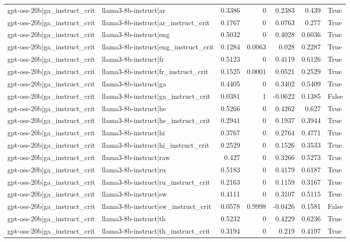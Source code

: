 \begin{table}
\begin{tabular}{l l r r r r l}
gpt-oss-20b|ga_instruct_crit & llama3-8b-instruct|ar & 0.3386 & 0 & 0.2383 & 0.439 & True \\
gpt-oss-20b|ga_instruct_crit & llama3-8b-instruct|ar_instruct_crit & 0.1767 & 0 & 0.0763 & 0.277 & True \\
gpt-oss-20b|ga_instruct_crit & llama3-8b-instruct|eng & 0.5032 & 0 & 0.4028 & 0.6036 & True \\
gpt-oss-20b|ga_instruct_crit & llama3-8b-instruct|eng_instruct_crit & 0.1284 & 0.0063 & 0.028 & 0.2287 & True \\
gpt-oss-20b|ga_instruct_crit & llama3-8b-instruct|fr & 0.5123 & 0 & 0.4119 & 0.6126 & True \\
gpt-oss-20b|ga_instruct_crit & llama3-8b-instruct|fr_instruct_crit & 0.1525 & 0.0001 & 0.0521 & 0.2529 & True \\
gpt-oss-20b|ga_instruct_crit & llama3-8b-instruct|ga & 0.4405 & 0 & 0.3402 & 0.5409 & True \\
gpt-oss-20b|ga_instruct_crit & llama3-8b-instruct|ga_instruct_crit & 0.0381 & 1 & -0.0622 & 0.1385 & False \\
gpt-oss-20b|ga_instruct_crit & llama3-8b-instruct|he & 0.5266 & 0 & 0.4262 & 0.627 & True \\
gpt-oss-20b|ga_instruct_crit & llama3-8b-instruct|he_instruct_crit & 0.2941 & 0 & 0.1937 & 0.3944 & True \\
gpt-oss-20b|ga_instruct_crit & llama3-8b-instruct|hi & 0.3767 & 0 & 0.2764 & 0.4771 & True \\
gpt-oss-20b|ga_instruct_crit & llama3-8b-instruct|hi_instruct_crit & 0.2529 & 0 & 0.1526 & 0.3533 & True \\
gpt-oss-20b|ga_instruct_crit & llama3-8b-instruct|raw & 0.427 & 0 & 0.3266 & 0.5273 & True \\
gpt-oss-20b|ga_instruct_crit & llama3-8b-instruct|ru & 0.5183 & 0 & 0.4179 & 0.6187 & True \\
gpt-oss-20b|ga_instruct_crit & llama3-8b-instruct|ru_instruct_crit & 0.2163 & 0 & 0.1159 & 0.3167 & True \\
gpt-oss-20b|ga_instruct_crit & llama3-8b-instruct|sw & 0.4111 & 0 & 0.3107 & 0.5115 & True \\
gpt-oss-20b|ga_instruct_crit & llama3-8b-instruct|sw_instruct_crit & 0.0578 & 0.9998 & -0.0426 & 0.1581 & False \\
gpt-oss-20b|ga_instruct_crit & llama3-8b-instruct|th & 0.5232 & 0 & 0.4229 & 0.6236 & True \\
gpt-oss-20b|ga_instruct_crit & llama3-8b-instruct|th_instruct_crit & 0.3194 & 0 & 0.219 & 0.4197 & True \\

\end{tabular}
\end{table}
